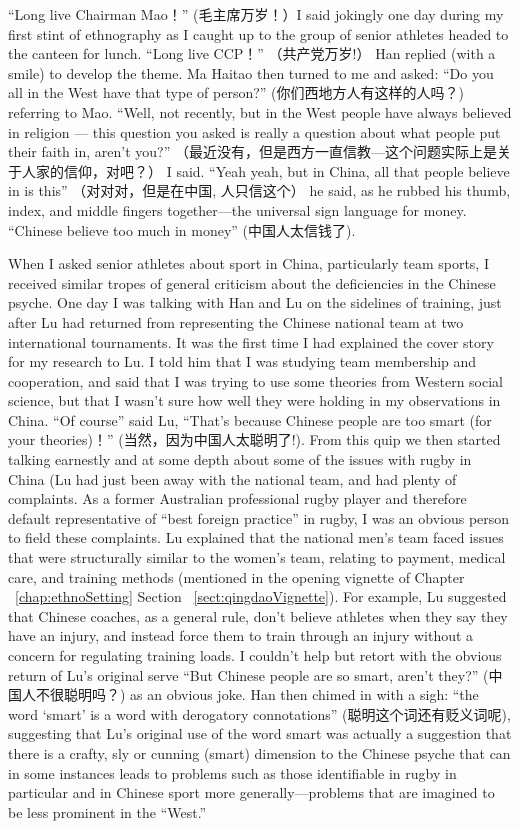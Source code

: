 \begin{CJK}{UTF8}{gbsn}
``Long live Chairman Mao！'' (毛主席万岁！）I said jokingly one day during my first stint of ethnography as I caught up to the group of senior athletes headed to the canteen for lunch.  ``Long live CCP！'' （共产党万岁!） Han replied (with a smile) to develop the theme.  Ma Haitao then turned to me and asked: ``Do you all in the West have that type of person?'' (你们西地方人有这样的人吗？) referring to Mao.  ``Well, not recently, but in the West people have always believed in religion --- this question you asked is really a question about what people put their faith in, aren't you?'' （最近没有，但是西方一直信教---这个问题实际上是关于人家的信仰，对吧？） I said.  ``Yeah yeah, but in China, all that people believe in is this'' （对对对，但是在中国, 人只信这个） he said, as he rubbed his thumb, index, and middle fingers together---the universal sign language for money. ``Chinese believe too much in money'' (中国人太信钱了).

When I asked senior athletes about sport in China, particularly team sports, I received similar tropes of general criticism about the deficiencies in the Chinese psyche.  One day I was talking with Han and Lu on the sidelines of training, just after Lu had returned from representing the Chinese national team at two international tournaments.  It was the first time I had explained the cover story for my research to Lu.  I told him that I was studying team membership and cooperation, and said that I was trying to use some theories from Western social science, but that I wasn't sure how well they were holding in my observations in China. ``Of course'' said Lu, ``That's because Chinese people are too smart (for your theories)！''  (当然，因为中国人太聪明了!).  From this quip we then started talking earnestly and at some depth about some of the issues with rugby in China (Lu had just been away with the national team, and had plenty of complaints.  As a former Australian professional rugby player and therefore default representative of ``best foreign practice'' in rugby, I was an obvious person to field these complaints. Lu explained that the national men's team faced issues that were structurally similar to the women's team, relating to payment, medical care, and training methods (mentioned in the opening vignette of Chapter ~\ref{chap:ethnoSetting} Section ~\ref{sect:qingdaoVignette}).  For example, Lu suggested that Chinese coaches, as a general rule, don't believe athletes when they say they have an injury, and instead force them to train through an injury without a concern for regulating training loads. I couldn't help but retort with the obvious return of Lu's original serve ``But Chinese people are so smart, aren't they?'' (中国人不很聪明吗？) as an obvious joke.  Han then chimed in with a sigh: ``the word `smart' is a word with derogatory connotations'' (聪明这个词还有贬义词呢), suggesting that Lu's original use of the word smart was actually a suggestion that there is a crafty, sly or cunning (smart) dimension to the Chinese psyche that can in some instances leads to problems such as those identifiable in rugby in particular and in Chinese sport more generally---problems that are imagined to be less prominent in the ``West.''


\end{CJK}
